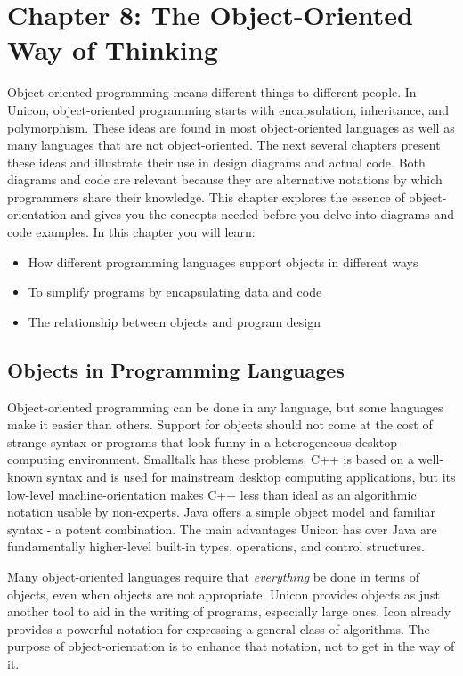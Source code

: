 \clearpage\section{Chapter 8: The Object-Oriented Way of Thinking}

Object-oriented programming means
different things to different people. In Unicon, object-oriented
programming starts with encapsulation, inheritance, and polymorphism.
These ideas are found in most object-oriented languages as well as many
languages that are not object-oriented. The next several chapters
present these ideas and illustrate their use in design diagrams and
actual code. Both diagrams and code are relevant because they are
alternative notations by which programmers share their knowledge. This
chapter explores the essence of object-orientation and gives you the
concepts needed before you delve into diagrams and code examples. In
this chapter you will learn:

\begin{itemize}
\item How different programming languages support objects in different
ways
\item To simplify programs by encapsulating data and code
\item The relationship between objects and program design
\end{itemize}

\subsection{Objects in Programming Languages}

Object-oriented programming can be done in any language, but some
languages make it easier than others. Support for objects should not
come at the cost of strange syntax or programs that look funny in a
heterogeneous desktop-computing environment. Smalltalk
has these problems. C++ is based on a well-known syntax and is used for
mainstream desktop computing applications, but its low-level
machine-orientation makes C++ less than ideal as an algorithmic
notation usable by non-experts. Java offers a simple object
model and familiar syntax - a potent combination. The main advantages
Unicon has over Java are fundamentally higher-level built-in types,
operations, and control structures.

Many object-oriented languages require that \textit{everything} be done
in terms of objects, even when objects are not appropriate. Unicon
provides objects as just another tool to aid in the writing of
programs, especially large ones. Icon already provides a powerful
notation for expressing a general class of algorithms. The purpose of
object-orientation is to enhance that notation, not to get in the way
of it.

